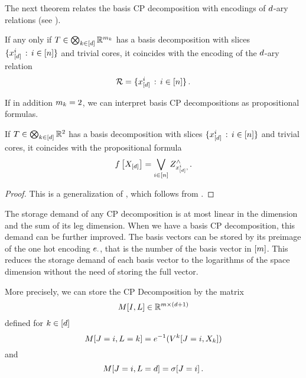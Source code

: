 %
The next theorem relates the basis CP decomposition with encodings of $d$-ary relations (see ).

\begin{theorem}
	If any only if $T\in\bigotimes_{k\in[d]} \mathbb{R}^{m_{k}}$ has a basis decomposition with slices $\{x_{[d]}^{i} \, : \, i\in[n] \}$ and trivial cores, it coincides with the encoding of the $d$-ary relation 
		\[ \mathcal{R} = \{x_{[d]}^{i} \, : \, i\in[n] \} \, . \]
\end{theorem}


If in addition $m_{k}=2$, we can interpret basis CP decompositions as propositional formulas.

\begin{theorem}
	If $T\in\bigotimes_{k\in[d]}\mathbb{R}^2$ has a basis decomposition with slices $\{x_{[d]}^{i} \, : \, i\in[n] \}$ and trivial cores, it coincides with the propositional formula
		\[ f\left[X_{[d]}\right] = 
		\bigvee_{i\in[n]} Z^{\land}_{x_{[d]}^{i},\,} . \]
\end{theorem}
\begin{proof}
	This is a generalization of , which follows from .
\end{proof}


The storage demand of any CP decomposition is at most linear in the dimension and the sum of its leg dimension.
When we have a basis CP decomposition, this demand can be further improved.
The basis vectors can be stored by its preimage of the one hot encoding $e_{\cdot}$, that is the number of the basis vector in $[m]$.
This reduces the storage demand of each basis vector to the logarithms of the space dimension without the need of storing the full vector.

More precisely, we can store the CP Decomposition by the matrix
	\[ M[I,L] \in \mathbb{R}^{m \times (d+1)} \]
defined for $k\in[d]$
	\[ M[J=i,L=k] 
	= e^{-1}(V^{k}[J=i,X_{k}])\]
and
	\[ M[J=i,L=d]  
	= \sigma[J=i] \, . \]
	
